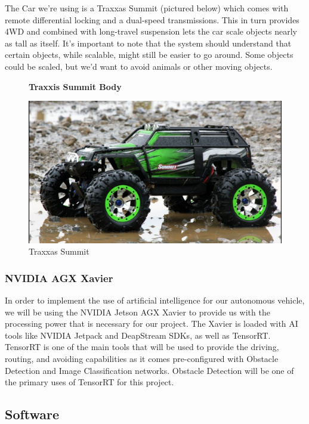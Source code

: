 \documentclass[onecolumn, draftclsnofoot,10pt]{IEEEtran}
\begin{document}
    The Car we're using is a Traxxas Summit (pictured below) which comes with remote differential locking and a dual-speed transmissions. This in turn provides 4WD and combined with long-travel suspension lets the car scale objects nearly as tall as itself. It's important to note that the system should understand that certain objects, while scalable, might still be easier to go around. Some objects could be scaled, but we'd want to avoid animals or other moving objects. 
    
\begin{figure}[h!]
  \centering
  \textbf{Traxxis Summit Body}\par\medskip
    \includegraphics[width=\linewidth]{Summit.jpg}
    \caption{Traxxas Summit}
\end{figure}
 

    


\subsubsection{NVIDIA AGX Xavier}
    In order to implement the use of artificial intelligence for our autonomous vehicle, we will be using the NVIDIA Jetson AGX Xavier to provide us with the processing power that is necessary for our project. The Xavier is loaded with AI tools like NVIDIA Jetpack and DeapStream SDKs, as well as TensorRT. TensorRT is one of the main tools that will be used to provide the driving, routing, and avoiding capabilities as it comes pre-configured with Obstacle Detection and Image Classification networks. Obstacle Detection will be one of the primary uses of TensorRT for this project.
\bigskip

\subsection{Software}
\end{document}
